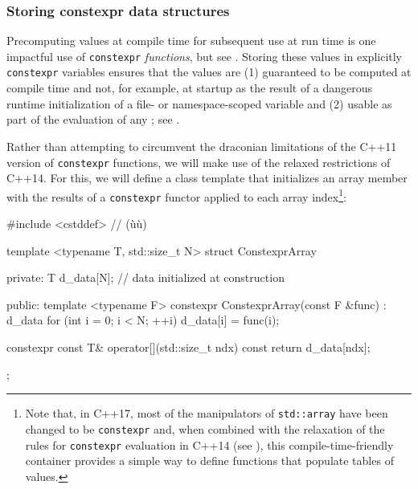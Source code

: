 \subsubsection[Storing \lstinline!constexpr! data structures]{Storing {\SubsubsecCode constexpr} data structures}\label{storing-constexpr-data-structures}

Precomputing values at compile time for subsequent use at run time
is one impactful use of \lstinline!constexpr! \emph{functions}, but see . Storing these values in explicitly
\lstinline!constexpr! variables ensures that the values are (1) guaranteed
to be computed at compile time and not, for example, at startup as the
result of a dangerous runtime initialization of a file- or
namespace-scoped variable and (2) usable as part of the evaluation of
any ; see .

Rather than attempting to circumvent the draconian limitations of the
C++11 version of \lstinline!constexpr! functions, we will make use of the
relaxed restrictions of C++14. For this, we will define a class template
that initializes an array member with the results of a
\lstinline!constexpr! functor applied to each array
index{\cprotect\footnote{Note that, in C++17, most of the manipulators
of \lstinline!std::array! have been changed to be \lstinline!constexpr! and,
when combined with the relaxation of the rules for \lstinline!constexpr!
evaluation in C++14 (see ), this compile-time-friendly container provides a simple way to
  define functions that populate tables of values.}}:

\begin{emcppshiddenlisting}[emcppsbatch=e3,emcppsstandards={c++14}]
#include <cstddef>  // (ù{}ù)
\end{emcppshiddenlisting}
\begin{emcppslisting}[emcppsbatch=e3]
template <typename T, std::size_t N>
struct ConstexprArray
{
private:
    T d_data[N];  // data initialized at construction

public:
    template <typename F>
    constexpr ConstexprArray(const F &func)
    : d_data{}
    {
        for (int i = 0; i < N; ++i)
        {
            d_data[i] = func(i);
        }
    }

    constexpr const T& operator[](std::size_t ndx) const
    {
        return d_data[ndx];
    }
};
\end{emcppslisting}
    
